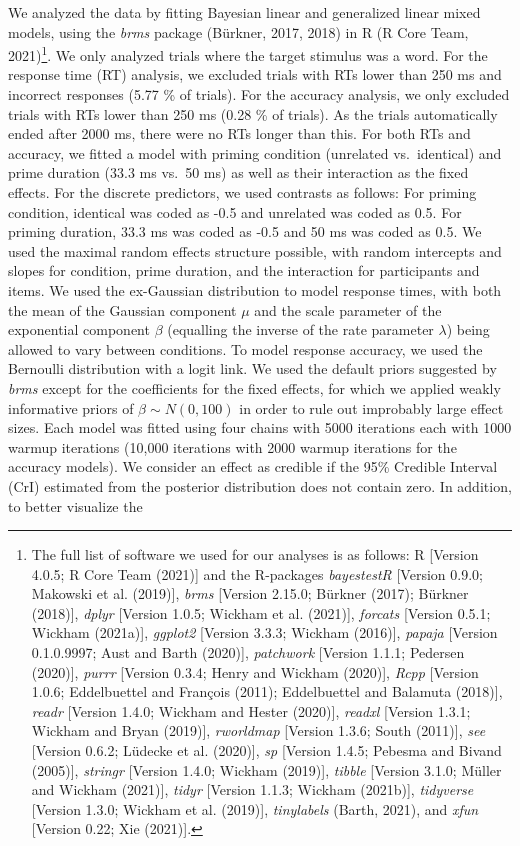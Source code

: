 \documentclass[
  english,
  man,floatsintext]{apa6}
\begin{document}
We analyzed the data by fitting Bayesian linear and generalized linear mixed models, using the \emph{brms} package (Bürkner, 2017, 2018) in R (R Core Team, 2021)\footnote{The full list of software we used for our analyses is as follows: R {[}Version 4.0.5; R Core Team (2021){]} and the R-packages \emph{bayestestR} {[}Version 0.9.0; Makowski et al. (2019){]}, \emph{brms} {[}Version 2.15.0; Bürkner (2017); Bürkner (2018){]}, \emph{dplyr} {[}Version 1.0.5; Wickham et al. (2021){]}, \emph{forcats} {[}Version 0.5.1; Wickham (2021a){]}, \emph{ggplot2} {[}Version 3.3.3; Wickham (2016){]}, \emph{papaja} {[}Version 0.1.0.9997; Aust and Barth (2020){]}, \emph{patchwork} {[}Version 1.1.1; Pedersen (2020){]}, \emph{purrr} {[}Version 0.3.4; Henry and Wickham (2020){]}, \emph{Rcpp} {[}Version 1.0.6; Eddelbuettel and François (2011); Eddelbuettel and Balamuta (2018){]}, \emph{readr} {[}Version 1.4.0; Wickham and Hester (2020){]}, \emph{readxl} {[}Version 1.3.1; Wickham and Bryan (2019){]}, \emph{rworldmap} {[}Version 1.3.6; South (2011){]}, \emph{see} {[}Version 0.6.2; Lüdecke et al. (2020){]}, \emph{sp} {[}Version 1.4.5; Pebesma and Bivand (2005){]}, \emph{stringr} {[}Version 1.4.0; Wickham (2019){]}, \emph{tibble} {[}Version 3.1.0; Müller and Wickham (2021){]}, \emph{tidyr} {[}Version 1.1.3; Wickham (2021b){]}, \emph{tidyverse} {[}Version 1.3.0; Wickham et al. (2019){]}, \emph{tinylabels} (Barth, 2021), and \emph{xfun} {[}Version 0.22; Xie (2021){]}.}. We only analyzed trials where the target stimulus was a word. For the response time (RT) analysis, we excluded trials with RTs lower than 250 ms and incorrect responses (5.77 \% of trials). For the accuracy analysis, we only excluded trials with RTs lower than 250 ms (0.28 \% of trials). As the trials automatically ended after 2000 ms, there were no RTs longer than this. For both RTs and accuracy, we fitted a model with priming condition (unrelated vs.~identical) and prime duration (33.3 ms vs.~50 ms) as well as their interaction as the fixed effects. For the discrete predictors, we used contrasts as follows: For priming condition, identical was coded as -0.5 and unrelated was coded as 0.5. For priming duration, 33.3 ms was coded as -0.5 and 50 ms was coded as 0.5. We used the maximal random effects structure possible, with random intercepts and slopes for condition, prime duration, and the interaction for participants and items. We used the ex-Gaussian distribution to model response times, with both the mean of the Gaussian component \(\mu\) and the scale parameter of the exponential component \(\beta\) (equalling the inverse of the rate parameter \(\lambda\)) being allowed to vary between conditions. To model response accuracy, we used the Bernoulli distribution with a logit link. We used the default priors suggested by \emph{brms} except for the coefficients for the fixed effects, for which we applied weakly informative priors of \(\beta \sim N(0,100)\) in order to rule out improbably large effect sizes. Each model was fitted using four chains with 5000 iterations each with 1000 warmup iterations (10,000 iterations with 2000 warmup iterations for the accuracy models). We consider an effect as credible if the 95\% Credible Interval (CrI) estimated from the posterior distribution does not contain zero. In addition, to better visualize the 
\end{document}
